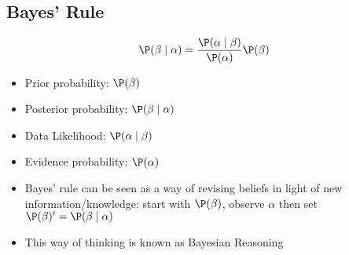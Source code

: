 \subsection{Bayes' Rule}
	\begin{frame}
		\[ \P( \beta \mid \alpha ) = \frac{\P( \alpha \mid \beta )}{\P( \alpha )} \P( \beta ) \]
		\begin{itemize}
			\item Prior probability: $\P( \beta )$
			\item Posterior probability: $\P( \beta \mid \alpha )$
			\item Data Likelihood: $\P( \alpha \mid \beta )$
			\item Evidence probability: $\P( \alpha )$
		\end{itemize}
		\begin{itemize}
			\item Bayes' rule can be seen as a way of \alert{revising beliefs} in light of new information/knowledge: start with $\P( \beta )$, observe $\alpha$ then set $\P( \beta )' = \P( \beta \mid \alpha )$
			\item This way of thinking is known as \alert{Bayesian Reasoning}
		\end{itemize}
	\end{frame}